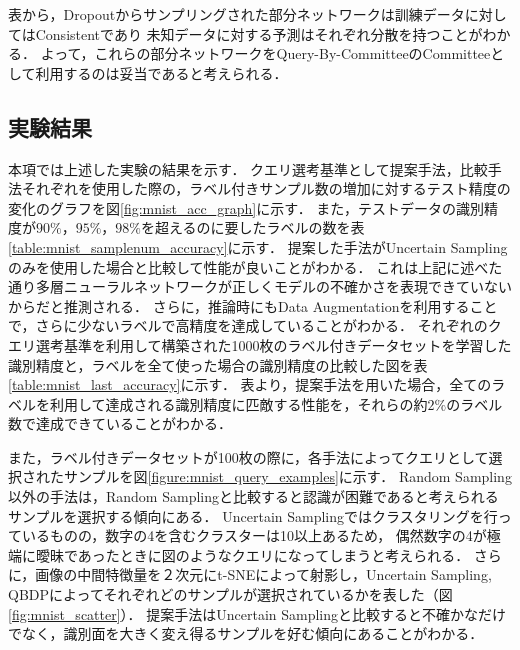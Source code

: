 \begin{table}[h!]

\end{table}

表から，Dropoutからサンプリングされた部分ネットワークは訓練データに対してはConsistentであり
未知データに対する予測はそれぞれ分散を持つことがわかる．
よって，これらの部分ネットワークをQuery-By-CommitteeのCommitteeとして利用するのは妥当であると考えられる．

\clearpage

\subsection{実験結果}
本項では上述した実験の結果を示す．
クエリ選考基準として提案手法，比較手法それぞれを使用した際の，ラベル付きサンプル数の増加に対するテスト精度の変化のグラフを図\ref{fig:mnist_acc_graph}に示す．
また，テストデータの識別精度が$90\%$，$95\%$，$98\%$を超えるのに要したラベルの数を表\ref{table:mnist_samplenum_accuracy}に示す．
提案した手法がUncertain Samplingのみを使用した場合と比較して性能が良いことがわかる．
これは上記に述べた通り多層ニューラルネットワークが正しくモデルの不確かさを表現できていないからだと推測される．
さらに，推論時にもData Augmentationを利用することで，さらに少ないラベルで高精度を達成していることがわかる．
それぞれのクエリ選考基準を利用して構築された1000枚のラベル付きデータセットを学習した識別精度と，ラベルを全て使った場合の識別精度の比較した図を表\ref{table:mnist_last_accuracy}に示す．
表より，提案手法を用いた場合，全てのラベルを利用して達成される識別精度に匹敵する性能を，それらの約$2\%$のラベル数で達成できていることがわかる．

また，ラベル付きデータセットが100枚の際に，各手法によってクエリとして選択されたサンプルを図\ref{figure:mnist_query_examples}に示す．
Random Sampling以外の手法は，Random Samplingと比較すると認識が困難であると考えられるサンプルを選択する傾向にある．
Uncertain Samplingではクラスタリングを行っているものの，数字の4を含むクラスターは10以上あるため，
偶然数字の4が極端に曖昧であったときに図のようなクエリになってしまうと考えられる．
さらに，画像の中間特徴量を２次元にt-SNEによって射影し，Uncertain Sampling, QBDPによってそれぞれどのサンプルが選択されているかを表した（図\ref{fig:mnist_scatter}）．
提案手法はUncertain Samplingと比較すると不確かなだけでなく，識別面を大きく変え得るサンプルを好む傾向にあることがわかる．

